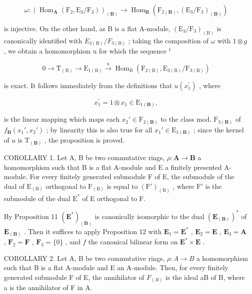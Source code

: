 \[
\omega : \left(\operatorname{Hom} _ {\mathbf {A}} (\mathrm{F} _ {2}, \mathrm{E} _ {3} / \mathrm{F} _ {3})\right) _ {(\mathbf {B})} \rightarrow \operatorname{Hom} _ {\mathbf {B}} (\mathrm{F} _ {2 (\mathbf {B})}, \left(\mathrm{E} _ {3} / \mathrm{F} _ {3}\right) _ {(\mathbf {B})})
\]

is injective. On the other hand, as B is a flat A-module, \((\mathrm{E}_{3}/\mathrm{F}_{3})_{(\mathrm{B})}\) is canonically identified with \(E_{3(\mathrm{B})}/F_{3(\mathrm{B})}\) ; taking the composition of \(\omega\) with \(1 \otimes g\) , we obtain a homomorphism u for which the sequence \(^{1}\)

\[
0 \longrightarrow \mathrm{T} _ {(\mathrm{B})} \longrightarrow \mathrm{E} _ {1 (\mathrm{B})} \stackrel {u} {\longrightarrow} \operatorname{Hom} _ {\mathrm{B}} \left(\mathrm{F} _ {2 (\mathrm{B})}, \mathrm{E} _ {3 (\mathrm{B})} / \mathrm{F} _ {3 (\mathrm{B})}\right)
\]

is exact. It follows immediately from the definitions that \(u(x_{1}^{\prime})\) , where

\[
x _ {1} ^ {\prime} = 1 \otimes x _ {1} \in \mathrm{E} _ {1 (\mathbf {B})},
\]

is the linear mapping which maps each \(x_2' \in \mathrm{F}_{2(\mathbf{B})}\) to the class mod. \(\mathrm{F}_{3(\mathbf{B})}\) of \(f_{\mathbf{B}}(x_1', x_2')\) ; by linearity this is also true for all \(x_1' \in \mathrm{E}_{1(\mathbf{B})}\) ; since the kernel of \(u\) is \(\mathrm{T}_{(\mathbf{B})}\) , the proposition is proved.

COROLLARY 1. Let A, B be two commutative rings, \(\rho: \mathbf{A} \to \mathbf{B}\) a homomorphism such that B is a flat A-module and E a finitely presented A-module. For every finitely generated submodule F of E, the submodule of the dual of \(\mathrm{E}_{(\mathrm{B})}\) orthogonal to \(\mathrm{F}_{(\mathrm{B})}\) is equal to \((\mathrm{F}')_{(\mathrm{B})}\) , where \(\mathrm{F}'\) is the submodule of the dual \(\mathrm{E}^*\) of E orthogonal to F.

By Proposition 11 \((\mathbf{E}^{*})_{(\mathbf{B})}\) is canonically isomorphic to the dual \((\mathbf{E}_{(\mathbf{B})})^{*}\) of \(\mathbf{E}_{(\mathbf{B})}\) . Then it suffices to apply Proposition 12 with \(\mathbf{E}_1 = \mathbf{E}^*\) , \(\mathbf{E}_2 = \mathbf{E}\) , \(\mathbf{E}_3 = \mathbf{A}\) , \(\mathbf{F}_2 = \mathbf{F}\) , \(\mathbf{F}_3 = \{0\}\) , and \(f\) the canonical bilinear form on \(\mathbf{E}^{*} \times \mathbf{E}\) .

COROLLARY 2. Let A, B be two commutative rings, \(\rho: A \to B\) a homomorphism such that B is a flat A-module and E an A-module. Then, for every finitely generated submodule F of E, the annihilator of \(F_{(B)}\) is the ideal aB of B, where a is the annihilator of F in A.

